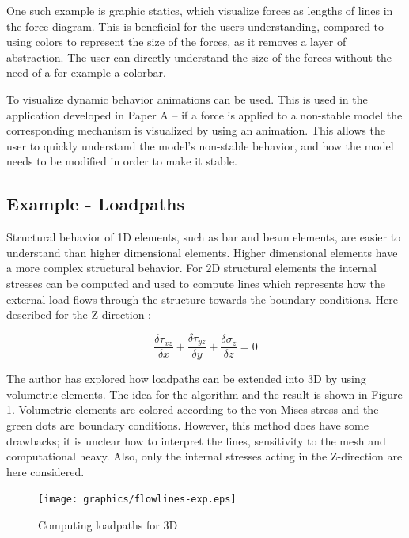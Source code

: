 One such example is graphic statics, which visualize forces as lengths of lines in the force diagram. This is beneficial for the users understanding, compared to using colors to represent the size of the forces, as it removes a layer of abstraction. The user can directly understand the size of the forces without the need of a for example a colorbar.

To visualize dynamic behavior animations can be used. This is used in the application developed in Paper A – if a force is applied to a non-stable model the corresponding mechanism is visualized by using an animation. This allows the user to quickly understand the model’s non-stable behavior, and how the model needs to be modified in order to make it stable. 

\subsection{Example - Loadpaths}
Structural behavior of 1D elements, such as bar and beam elements, are easier to understand than higher dimensional elements. Higher dimensional elements have a more complex structural behavior. For 2D structural elements the internal stresses can be computed and used to compute lines which represents how the external load flows through the structure towards the boundary conditions. Here described for the Z-direction \cite{Fonseca1997}:

\begin{equation*}
\frac{\delta \tau_{xz}}{\delta x} + \frac{\delta \tau_{yz}}{\delta y} + \frac{\delta \sigma_{z}}{\delta z}= 0
\end{equation*}

The author has explored how loadpaths can be extended into 3D by using volumetric elements. The idea for the algorithm and the result is shown in Figure \ref{fig:flowlines-exp}. Volumetric elements are colored according to the von Mises stress and the green dots are boundary conditions. However, this method does have some drawbacks; it is unclear how to interpret the lines, sensitivity to the mesh and computational heavy. Also, only the internal stresses acting in the Z-direction are here considered.
 
\begin{figure}
  \texttt{[image: graphics/flowlines-exp.eps]}
  \caption{Computing loadpaths for 3D}
  \label{fig:flowlines-exp}
\end{figure}